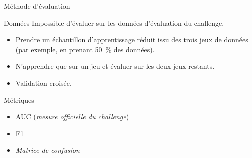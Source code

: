 \documentclass[compress,xcolor=table]{beamer}
\begin{document}
\begin{frame}{Méthode d'évaluation}

    \begin{exampleblock}{Données}
        Impossible d'évaluer sur les données d'évaluation du challenge.
        \begin{itemize}
            \item Prendre un échantillon d'apprentissage réduit issu des trois jeux de données (par exemple, en prenant 50~\% des données).
            \item N'apprendre que sur un jeu et évaluer sur les deux jeux restants.
            \item Validation-croisée.
        \end{itemize}
    \end{exampleblock}

    \begin{exampleblock}{Métriques}
        \begin{itemize}
            \item AUC (\textit{mesure officielle du challenge})
            \item F1
            \item \textit{Matrice de confusion}
        \end{itemize}
    \end{exampleblock}

\end{frame}
\end{document}
